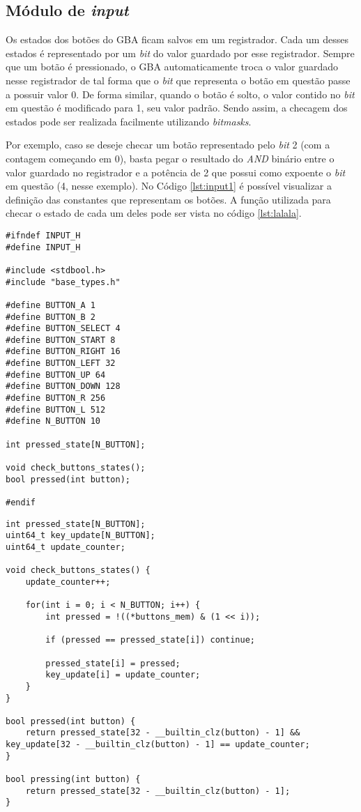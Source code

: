 \subsection{Módulo de \textit{input}}

Os estados dos botões do GBA ficam salvos em um registrador. Cada um desses estados é representado por um \textit{bit} do valor guardado por esse registrador. Sempre que um botão é pressionado, o GBA automaticamente troca o valor guardado nesse registrador de tal forma que o \textit{bit} que representa o botão em questão passe a possuir valor 0. De forma similar, quando o botão é solto, o valor contido no \textit{bit} em questão é modificado para 1, seu valor padrão. Sendo assim, a checagem dos estados pode ser realizada facilmente utilizando \textit{bitmasks}.

Por exemplo, caso se deseje checar um botão representado pelo \textit{bit} 2 (com a contagem começando em 0), basta pegar o resultado do \textit{AND} binário entre o valor guardado no registrador e a potência de 2 que possui como expoente o \textit{bit} em questão (4, nesse exemplo). No Código \ref{lst:input1} é possível visualizar a definição das constantes que representam os botões. A função utilizada para checar o estado de cada um deles pode ser vista no código \ref{lst:lalala}.

\begin{lstlisting}[caption={Cabeçalho do módulo de \textit{input}.},label={lst:input1}]
#ifndef INPUT_H
#define INPUT_H

#include <stdbool.h>
#include "base_types.h"

#define BUTTON_A 1
#define BUTTON_B 2
#define BUTTON_SELECT 4
#define BUTTON_START 8
#define BUTTON_RIGHT 16
#define BUTTON_LEFT 32
#define BUTTON_UP 64
#define BUTTON_DOWN 128
#define BUTTON_R 256
#define BUTTON_L 512
#define N_BUTTON 10

int pressed_state[N_BUTTON];

void check_buttons_states();
bool pressed(int button);

#endif
\end{lstlisting}

\begin{lstlisting}[caption={Código-fonte do módulo de \textit{input}.},label={lst:lalala}]
int pressed_state[N_BUTTON];
uint64_t key_update[N_BUTTON];
uint64_t update_counter;

void check_buttons_states() {
    update_counter++;

	for(int i = 0; i < N_BUTTON; i++) {
        int pressed = !((*buttons_mem) & (1 << i));

        if (pressed == pressed_state[i]) continue;

        pressed_state[i] = pressed;
        key_update[i] = update_counter;
	}
}

bool pressed(int button) {
	return pressed_state[32 - __builtin_clz(button) - 1] && key_update[32 - __builtin_clz(button) - 1] == update_counter;
}

bool pressing(int button) {
	return pressed_state[32 - __builtin_clz(button) - 1];
}
\end{lstlisting}

